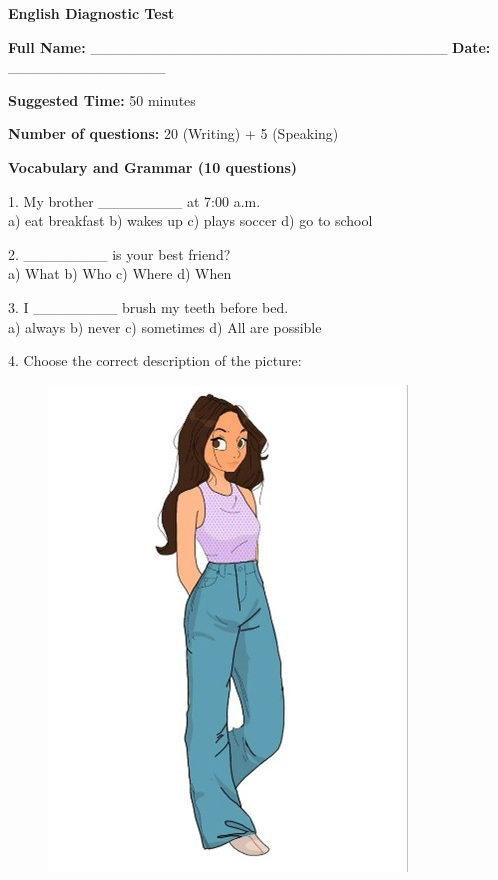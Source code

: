 \documentclass[12pt, a4paper]{article}
\begin{document}
\begin{center}
    \Large \textbf{English Diagnostic Test} \\[1ex]
\end{center}

\bigskip

\textbf{Full Name:} \_\_\_\_\_\_\_\_\_\_\_\_\_\_\_\_\_\_\_\_\_\_\_\_\_\_\_\_\_\_\_\_\_\_ \hfill
\textbf{Date:} \_\_\_\_\_\_\_\_\_\_\_\_\_\_\_

\textbf{Suggested Time:} 50 minutes

\smallskip

\textbf{Number of questions:} 20 (Writing) + 5 (Speaking)

\vspace{1em}

\begin{center}
    \large \textbf{Vocabulary and Grammar (10 questions)}
\end{center}

1. My brother \_\_\_\_\_\_\_\_ at 7:00 a.m.\\
a) eat breakfast \quad b) wakes up \quad c) plays soccer \quad d) go to school

\smallskip

2. \_\_\_\_\_\_\_\_ is your best friend?\\
a) What \quad b) Who \quad c) Where \quad d) When

\smallskip

3. I \_\_\_\_\_\_\_\_ brush my teeth before bed.\\
a) always \quad b) never \quad c) sometimes \quad d) All are possible

\smallskip

4. Choose the correct description of the picture:\\

\begin{figure}[H]
    \includegraphics[width=.3\linewidth]{../../../images/Point4-EnglishExam.jpg}
\end{figure}
\end{document}
